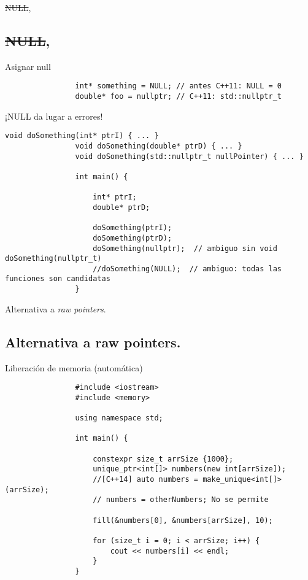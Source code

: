 \documentclass{beamer}
\newcommand{\normalSizeItem}[1] {
  \normalsize{\item #1}
}
\begin{document}
		\begin{frame}[fragile]{\sout{NULL}, }	
			\subsection{\sout{NULL}, }
			\begin{itemize}
			
				\normalSizeItem { Asignar null}
				\begin{lstlisting}
				int* something = NULL; // antes C++11: NULL = 0
				double* foo = nullptr; // C++11: std::nullptr_t
				\end{lstlisting}
			
				\normalSizeItem { ¡NULL da lugar a errores! }
				\begin{lstlisting}[basicstyle={\tiny\ttfamily}]
				void doSomething(int* ptrI) { ... }
				void doSomething(double* ptrD) { ... }
				void doSomething(std::nullptr_t nullPointer) { ... } 
				
				int main() {
				
					int* ptrI;
					double* ptrD;
				 
					doSomething(ptrI);
					doSomething(ptrD);
					doSomething(nullptr);  // ambiguo sin void doSomething(nullptr_t)
					//doSomething(NULL);  // ambiguo: todas las funciones son candidatas
				}
				\end{lstlisting}
				
			\end{itemize}
		\end{frame}
		
		\begin{frame}[fragile]{Alternativa a \textit{raw pointers}. }	
			\subsection{Alternativa a raw pointers. }
	
			\begin{itemize}
			
				\normalSizeItem { Liberación de memoria (automática) }
				\begin{lstlisting}
				#include <iostream>
				#include <memory>
				
				using namespace std;
				
				int main() {	
					
					constexpr size_t arrSize {1000};
					unique_ptr<int[]> numbers(new int[arrSize]);
					//[C++14] auto numbers = make_unique<int[]>(arrSize);
					// numbers = otherNumbers; No se permite
					
					fill(&numbers[0], &numbers[arrSize], 10);
					
					for (size_t i = 0; i < arrSize; i++) {
						cout << numbers[i] << endl;
					}
				}
				\end{lstlisting}				
			\end{itemize}
		\end{frame}
		
\end{document}
